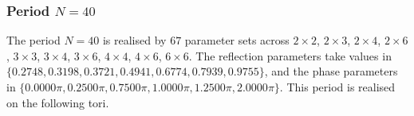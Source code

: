 \par
\subsubsection{Period $N = 40$}
The period $N=40$ is realised by $67$ parameter sets across $2\times2$, $2\times3$, $2\times4$, $2\times6$, $3\times3$, $3\times4$, $3\times6$, $4\times4$, $4\times6$, $6\times6$. The reflection parameters take values in $\{0.2748, 0.3198, 0.3721, 0.4941, 0.6774, 0.7939, 0.9755\}$, and the phase parameters in $\{0.0000\pi, 0.2500\pi, 0.7500\pi, 1.0000\pi, 1.2500\pi, 2.0000\pi\}$. This period is realised on the following tori.
